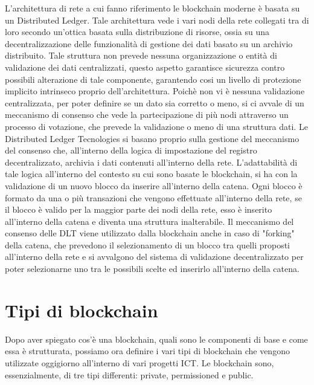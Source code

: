 L'architettura di rete a cui fanno riferimento le blockchain moderne è basata su un Distributed Ledger. Tale architettura vede i vari nodi della rete collegati tra di loro secondo un'ottica basata sulla distribuzione di risorse, ossia su una decentralizzazione delle funzionalità di gestione dei dati basato su un archivio distribuito. Tale struttura non prevede nessuna organizzazione o entità di validazione dei dati centralizzati, questo aspetto garantisce sicurezza contro possibili alterazione di tale componente, garantendo cosi un livello di protezione implicito intrinseco proprio dell'architettura. Poichè non vi è nessuna validazione centralizzata, per poter definire se un dato sia corretto o meno, si ci avvale di un meccanismo di consenso che vede la partecipazione di più nodi attraverso un processo di votazione, che prevede la validazione o meno di una struttura dati. Le Distributed Ledger Tecnologies si basano proprio sulla gestione del meccanismo del consenso che, all'interno della logica di impostazione del registro decentralizzato,  archivia i dati contenuti all'interno della rete. L'adattabilità di tale logica all'interno del contesto su cui sono basate le blockchain, si ha con la validazione di un nuovo blocco da inserire all'interno della catena. Ogni blocco è formato da una o più transazioni che vengono effettuate all'interno della rete, se il blocco è valido per la maggior parte dei nodi della rete, esso è inserito all'interno della catena e diventa una struttura inalterabile. Il meccanismo del consenso delle DLT viene utilizzato dalla blockchain anche in caso di "forking" della catena, che prevedono il selezionamento di un blocco tra quelli proposti all'interno della rete e si avvalgono del sistema di validazione decentralizzato per poter selezionarne uno tra le possibili scelte ed inserirlo all'interno della catena. 
\section{Tipi di blockchain}
Dopo aver spiegato cos'è una blockchain, quali sono le componenti di base e come essa è strutturata, possiamo ora definire i vari tipi di blockchain che vengono utilizzate oggigiorno all'interno di vari progetti ICT. 
Le blockchain sono, essenzialmente, di tre tipi differenti: private, permissioned e public.
